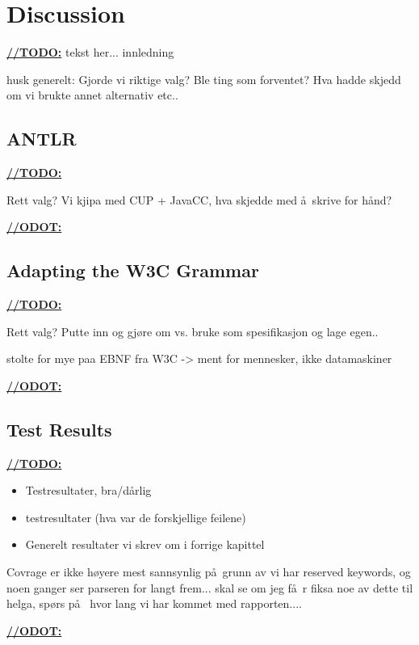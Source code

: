 \chapter{Discussion}
\underline{\textbf{\LARGE //TODO:}} tekst her... innledning


husk generelt: Gjorde vi riktige valg? Ble ting som forventet? Hva hadde skjedd om vi brukte annet alternativ etc..






\section{ANTLR}
\underline{\textbf{\LARGE //TODO:}}

Rett valg?
Vi kjipa med CUP + JavaCC, hva skjedde med \aa~skrive for h\aa nd?

\underline{\textbf{\LARGE //ODOT:}}

\section{Adapting the W3C Grammar}
\underline{\textbf{\LARGE //TODO:}}

Rett valg? Putte inn og gj\o re om vs. bruke som spesifikasjon og lage egen..

stolte for mye paa EBNF fra W3C -> ment for mennesker, ikke datamaskiner

\underline{\textbf{\LARGE //ODOT:}}


\section{Test Results}

\underline{\textbf{\LARGE //TODO:}}
\begin{itemize}
\item Testresultater, bra/d\aa rlig
\item testresultater (hva var de forskjellige feilene)
\item Generelt resultater vi skrev om i forrige kapittel
\end{itemize}

Covrage er ikke h\o yere mest sannsynlig p\aa~grunn av vi har reserved keywords, og noen ganger ser parseren for langt frem... skal se om jeg f\aa~r fiksa noe av dette til helga, sp\o rs p\aa~ hvor lang vi har kommet med rapporten....

\underline{\textbf{\LARGE //ODOT:}}

